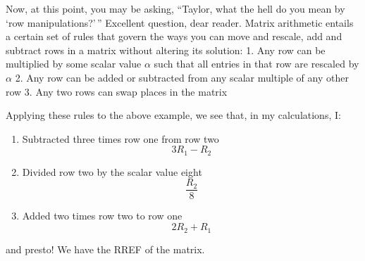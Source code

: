 \documentclass{article}
\providecommand{\tightlist}{%
      \setlength{\itemsep}{0pt}\setlength{\parskip}{0pt}}
\begin{document}
    Now, at this point, you may be asking, ``Taylor, what the hell do you
mean by `row manipulations?'\,'' Excellent question, dear reader. Matrix
arithmetic entails a certain set of rules that govern the ways you can
move and rescale, add and subtract rows in a matrix without altering its
solution: 1. Any row can be multiplied by some scalar value \(\alpha\)
such that all entries in that row are rescaled by \(\alpha\) 2. Any row
can be added or subtracted from any scalar multiple of any other row 3.
Any two rows can swap places in the matrix

Applying these rules to the above example, we see that, in my
calculations, I:

\begin{enumerate}
\def\labelenumi{\arabic{enumi}.}
\tightlist
\item
  Subtracted three times row one from row two \[3R_1 - R_2\]
\item
  Divided row two by the scalar value eight\\
  \[\dfrac{R_2}{8}\]
\item
  Added two times row two to row one \[2R_2 + R_1\]
\end{enumerate}

and presto! We have the RREF of the matrix.


    
    
    
    
\end{document}
